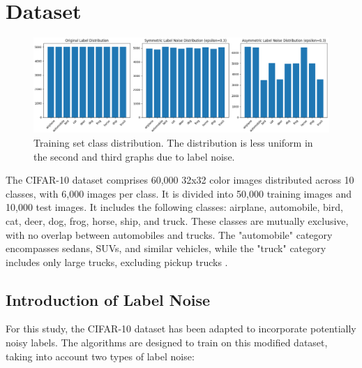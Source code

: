 \documentclass[11pt,twocolumn,letterpaper]{article}
\begin{document}
\section{Dataset}
\begin{figure}[!htb]
    \centering
    \includegraphics[width=1\linewidth]{dataset.png}
    \caption{Training set class distribution. The distribution is less uniform in the second and third graphs due to label noise.}
    \label{dataset}
\end{figure}
The CIFAR-10 dataset comprises 60,000 32x32 color images distributed across 10 classes, with 6,000 images per class. It is divided into 50,000 training images and 10,000 test images. It includes the following classes: airplane, automobile, bird, cat, deer, dog, frog, horse, ship, and truck. These classes are mutually exclusive, with no overlap between automobiles and trucks. The "automobile" category encompasses sedans, SUVs, and similar vehicles, while the "truck" category includes only large trucks, excluding pickup trucks \cite{CIFAR10CIFAR100Datasets}.

\subsection{Introduction of Label Noise}

For this study, the CIFAR-10 dataset has been adapted to incorporate potentially noisy labels. The algorithms are designed to train on this modified dataset, taking into account two types of label noise:
\end{document}
